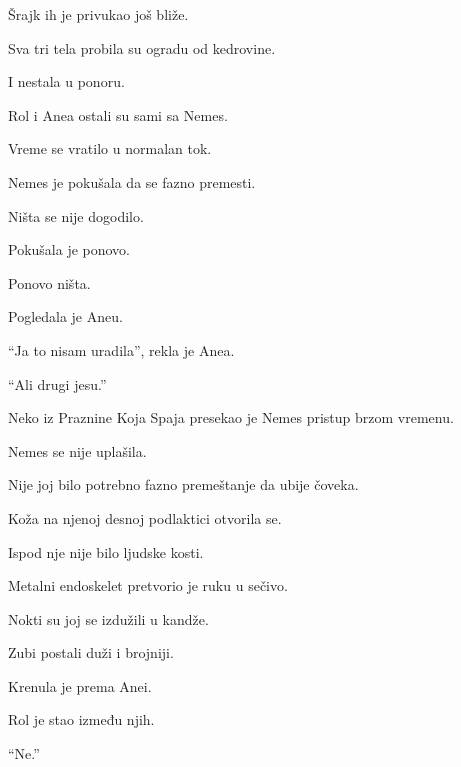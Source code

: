 Šrajk ih je privukao još bliže.

\bigskip

Sva tri tela probila su ogradu od kedrovine.

\bigskip

I nestala u ponoru.

\bigskip

Rol i Anea ostali su sami sa Nemes.

\bigskip

Vreme se vratilo u normalan tok.

\bigskip

Nemes je pokušala da se fazno premesti.

\bigskip

Ništa se nije dogodilo.

\bigskip

Pokušala je ponovo.

\bigskip

Ponovo ništa.

\bigskip

Pogledala je Aneu.

\bigskip

``Ja to nisam uradila'', rekla je Anea.

``Ali drugi jesu.''

\bigskip

Neko iz Praznine Koja Spaja presekao je Nemes pristup brzom vremenu.

\bigskip

Nemes se nije uplašila.

\bigskip

Nije joj bilo potrebno fazno premeštanje da ubije čoveka.

\bigskip

Koža na njenoj desnoj podlaktici otvorila se.

Ispod nje nije bilo ljudske kosti.

\bigskip

Metalni endoskelet pretvorio je ruku u sečivo.

\bigskip

Nokti su joj se izdužili u kandže.

Zubi postali duži i brojniji.

\bigskip

Krenula je prema Anei.

\bigskip

Rol je stao između njih.

\bigskip

``Ne.''

